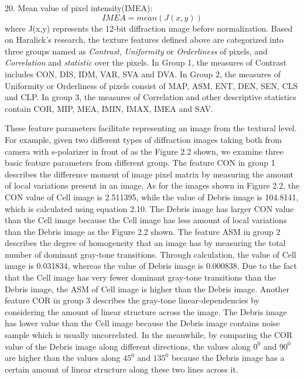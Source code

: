 20. Mean value of pixel intensity(IMEA):
\begin{equation}
IMEA = mean(J(x,y))
\end{equation}
where J(x,y) represents the 12-bit diffraction image before normalization. Based on Haralick's research\cite{Thati}, the texture features defined above are categorized into three groups named as \textit{Contrast}, \textit{Uniformity} or \textit{Orderliness} of pixels, and \textit{Correlation} and \textit{statistic} over the pixels. In Group 1, the measures of Contrast includes CON, DIS, IDM, VAR, SVA and DVA. In Group 2, the measures of Uniformity or Orderliness of pixels consist of MAP, ASM, ENT, DEN, SEN, CLS and CLP. In group 3, the measures of Correlation and other descriptive statistics contain COR, MIP, MEA, IMIN, IMAX, IMEA and SAV.\par
These feature parameters facilitate representing an image from the textural level. For example, given two different types of diffraction images taking both from camera with s-polarizer in front of as the Figure 2.2 shown, we examine three basic feature parameters from different group. The feature CON in group 1 describes the difference moment of image pixel matrix by measuring the amount of local variations present in an image. As for the images shown in Figure 2.2, the CON value of Cell image is 2.511395, while the value of Debris image is 104.8141, which is calculated using equation 2.10. The Debris image has larger CON value than the Cell image because the Cell image has less amount of local variations than the Debris image as the Figure 2.2 shown. The feature ASM in group 2 describes the degree of homogeneity that an image has by measuring the total number of dominant gray-tone transitions. Through calculation, the value of Cell image is 0.031834, whereas the value of Debris image is 0.000838. Due to the fact that the Cell image has very fewer dominant gray-tone transitions than the Debris image, the ASM of Cell image is higher than the Debris image. Another feature COR in group 3 describes the gray-tone linear-dependencies by considering the amount of linear structure across the image. The Debris image has lower value than the Cell image because the Debris image contains noise sample which is usually uncorrelated. In the meanwhile, by comparing the COR value of the Debris image along different directions, the values along $0^0$ and $90^0$ are higher than the values along $45^0$ and $135^0$ because the Debris image has a certain amount of linear structure along these two lines across it. 
